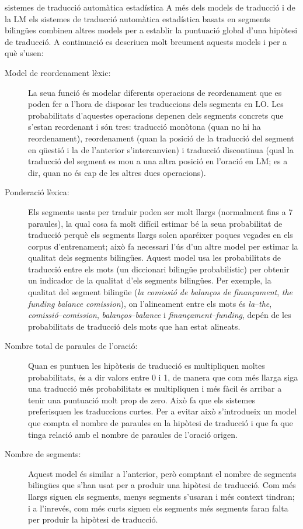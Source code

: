 \begin{persabermes}{sistemes de traducció automàtica estadística}
  A més dels models de traducció i de la LM els sistemes de traducció
  automàtica estadística basats en segments bilingües combinen altres
  models per a establir la puntuació global d'una hipòtesi de
  traducció. A continuació es descriuen molt breument aquests models i
  per a què s'usen:
  \begin{description}
  \item[Model de reordenament lèxic:] La seua funció és modelar
    diferents operacions de reordenament que es poden fer a l'hora de
    disposar les traduccions dels segments en LO. Les probabilitats
    d'aquestes operacions depenen dels segments concrets que s'estan
    reordenant i són tres: traducció monòtona (quan no hi ha
    reordenament), reordenament (quan la posició de la traducció del
    segment en qüestió i la de l'anterior s'intercanvien) i traducció
    discontinua (qual la traducció del segment es mou a una altra
    posició en l'oració en LM; es a dir, quan no és cap de les altres
    dues operacions).
  \item[Ponderació lèxica:] Els segments usats per traduir poden ser
    molt llargs (normalment fins a 7 paraules), la qual cosa fa molt
    difícil estimar bé la seua probabilitat de traducció perquè els
    segments llargs solen aparéixer poques vegades en els corpus
    d'entrenament; això fa necessari l'ús d'un altre model per estimar
    la qualitat dels segments bilingües. Aquest model usa les
    probabilitats de traducció entre els mots (un diccionari bilingüe
    probabilístic) per obtenir un indicador de la qualitat d'els
    segments bilingües. Per exemple, la qualitat del segment bilingüe
    (\emph{la comissió de balanços de finançament}, \emph{the funding
      balance comission}), on l'alineament entre els mots és
    \emph{la}--\emph{the}, \emph{comissió}--\emph{comission},
    \emph{balanços}--\emph{balance} i
    \emph{finançament}--\emph{funding}, depén de les probabilitats de
    traducció dels mots que han estat alineats.
  \item[Nombre total de paraules de l'oració:] Quan es puntuen les
    hipòtesis de traducció es multipliquen moltes probabilitats, és a
    dir valors entre 0 i 1, de manera que com més llarga siga una
    traducció més probabilitats es multipliquen i més fàcil és arribar
    a tenir una puntuació molt prop de zero. Això fa que els sistemes
    preferisquen les traduccions curtes. Per a evitar això
    s'introdueix un model que compta el nombre de paraules en la
    hipòtesi de traducció i que fa que tinga relació amb el nombre de
    paraules de l'oració origen.
  \item[Nombre de segments:] Aquest model és similar a l'anterior, però
    comptant el nombre de segments bilingües que s'han usat per a
    produir una hipòtesi de traducció. Com més llargs siguen els
    segments, menys segments s'usaran i més context tindran; i a
    l'inrevés, com més curts siguen els segments més segments faran
    falta per produir la hipòtesi de traducció.
  \end{description}


\end{persabermes}
